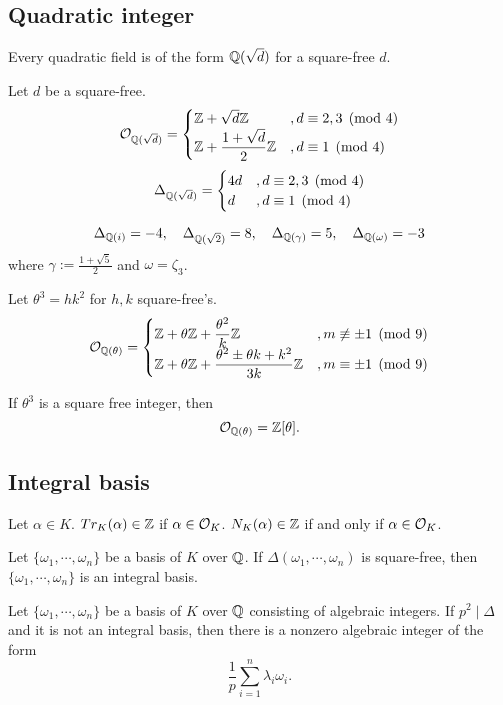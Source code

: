\documentclass[11pt]{article}
\begin{document}
\subsection{Quadratic integer}
\begin{thm}
Every quadratic field is of the form $\mathbb{Q}(\sqrt d)$ for a square-free $d$.
\end{thm}
\begin{thm}
Let $d$ be a square-free.
\[\mathcal{O}_{\mathbb{Q}(\sqrt d)}=\begin{cases}\mathbb{Z}+\sqrt d\mathbb{Z}&,d\equiv2,3\pmod4\\\displaystyle\mathbb{Z}+\frac{1+\sqrt d}2\mathbb{Z}&,d\equiv1\pmod4\end{cases}\]
\[\Delta_{\mathbb{Q}(\sqrt d)}=\begin{cases}4d&,d\equiv2,3\pmod4\\ d&,d\equiv1\pmod4\end{cases}\]
\end{thm}
\begin{ex}
\[\Delta_{\mathbb{Q}(i)}=-4,\quad\Delta_{\mathbb{Q}(\sqrt2)}=8,\quad\Delta_{\mathbb{Q}(\gamma)}=5,\quad\Delta_{\mathbb{Q}(\omega)}=-3\]
where $\gamma:=\frac{1+\sqrt5}2$ and $\omega=\zeta_3$.
\end{ex}
\begin{thm}
Let $\theta^3=hk^2$ for $h,k$ square-free's.
\[\mathcal{O}_{\mathbb{Q}(\theta)}=\begin{cases}\displaystyle\mathbb{Z}+\theta\mathbb{Z}+\frac{\theta^2}k\mathbb{Z}&,m\not\equiv\pm1\pmod9\\
\displaystyle\mathbb{Z}+\theta\mathbb{Z}+\frac{\theta^2\pm\theta k+k^2}{3k}\mathbb{Z}&,m\equiv\pm1\pmod9\end{cases}\]
\end{thm}
\begin{cor}
If $\theta^3$ is a square free integer, then
\[\mathcal{O}_{\mathbb{Q}(\theta)}=\mathbb{Z}[\theta].\]
\end{cor}

\subsection{Integral basis}
\begin{thm}
Let $\alpha\in K$.
$Tr_K(\alpha)\in\mathbb{Z}$ if $\alpha\in\mathcal{O}_K$.
$N_K(\alpha)\in\mathbb{Z}$ if and only if $\alpha\in\mathcal{O}_K$.
\end{thm}
\begin{thm}
Let $\{\omega_1,\cdots,\omega_n\}$ be a basis of $K$ over $\mathbb{Q}$.
If $\Delta(\omega_1,\cdots,\omega_n)$ is square-free, then $\{\omega_1,\cdots,\omega_n\}$ is an integral basis.
\end{thm}
\begin{thm}
Let $\{\omega_1,\cdots,\omega_n\}$ be a basis of $K$ over $\mathbb{Q}$ consisting of algebraic integers.
If $p^2\mid\Delta$ and it is not an integral basis, then there is a nonzero algebraic integer of the form
\[\frac1p\sum_{i=1}^n\lambda_i\omega_i.\]
\end{thm}
\end{document}
